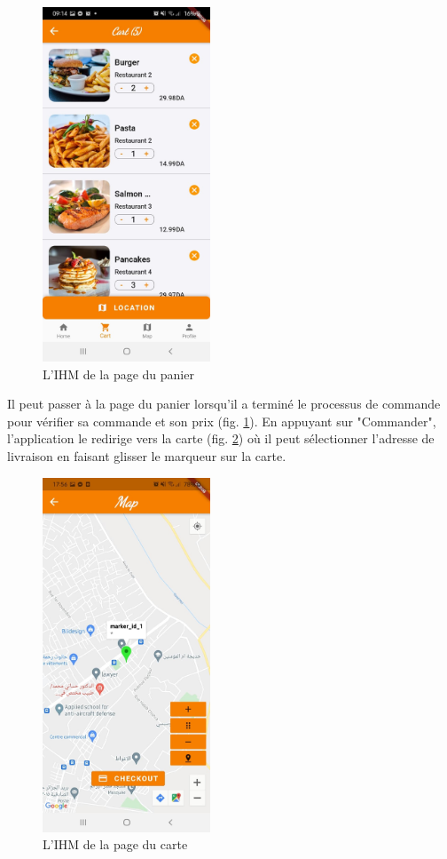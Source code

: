 \documentclass[french, a4paper, 12pt]{report}
\begin{document}
		\begin{figure}[h!]
			\center
			\includegraphics[width=5cm]{screenshots/ClientViews/theCART.jpg}
			\caption{L'IHM de la page du panier}
			\label{fig:clicrt}
		\end{figure}

\newpage
Il peut passer à la page du panier lorsqu'il a terminé le processus de commande pour vérifier sa commande et son prix (fig. \ref{fig:clicrt}).
En appuyant sur "Commander", l'application le redirige vers la carte (fig. \ref{fig:climap}) où il peut sélectionner l'adresse de livraison en faisant glisser le marqueur sur la carte.
		\begin{figure}[h!]
			\center
			\includegraphics[width=5cm]{screenshots/ClientViews/Deliverymap(fonctional).jpg}
			\caption{L'IHM de la page du carte}
			\label{fig:climap}
		\end{figure}
\end{document}

